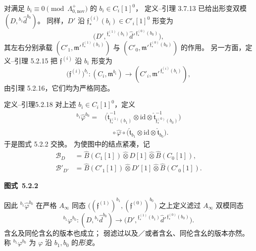 对满足
$b_i\equiv0\pmod{\Lambda_{0,\mathrm{nov}}^+}$
的 $b_i\in C_i[1]^0$，
定义--引理 3.7.13 已给出形变双模
$(D,{}^{b_1}\widehat d^{b_0})$。
同样，$D'$ 沿
$\mathfrak f^{(i)}_*(b_i)\in C'_i[1]^0$
形变为
\[
\bigl(D',{}^{\mathfrak f^{(1)}_*(b_1)}
\widehat d'^{\,\mathfrak f^{(0)}_*(b_0)}\bigr),
\]
其左右分别承载
$(C'_1,\mathfrak m'^{\,\mathfrak f^{(1)}_*(b_1)})$
与
$(C'_0,\mathfrak m'^{\,\mathfrak f^{(0)}_*(b_0)})$
的作用。
另一方面，定义--引理 5.2.15 把
$\mathfrak f^{(i)}$ 沿 $b_i$ 形变为
\[
\bigl(\mathfrak f^{(i)}\bigr)^{b_i}:
(C_i,\mathfrak m^{b_i})
\longrightarrow
(C'_i,\mathfrak m'^{\,\mathfrak f^{(i)}_*(b_i)}),
\]
由引理 5.2.16，它们均为严格同态。

\begin{statement}{定义--引理}{5.2.18}\label{deflem:5-2-18}
对上述 $b_i\in C_i[1]^0$，定义
\[
\begin{aligned}
{}^{b_1}\widehat\varphi^{b_0}
={}&\bigl(
\widehat{\mathfrak t}_{\mathfrak f^{(1)}_*(b_1)}^{-1}
\otimes\mathrm{id}\otimes
\widehat{\mathfrak t}_{\mathfrak f^{(0)}_*(b_0)}^{-1}
\bigr)\\
&\quad\circ\widehat\varphi\circ
\bigl(\widehat{\mathfrak t}_{b_1}
\otimes\mathrm{id}\otimes
\widehat{\mathfrak t}_{b_0}\bigr).
\end{aligned}
\]
于是图式 5.2.2 交换。
为使图中的结点紧凑，记
\[
\begin{aligned}
\mathcal B_D
&=\widehat B(C_1[1])\widehat\otimes D[1]
\widehat\otimes\widehat B(C_0[1]),\\
\mathcal B'_{D'}
&=\widehat B(C'_1[1])\widehat\otimes D'[1]
\widehat\otimes\widehat B(C'_0[1]).
\end{aligned}
\]
{\renewcommand{\thefigure}{5.2.2}
\begin{center}
{\normalfont\bfseries 图式~\thefigure}\label{diag:5-2-2}
\end{center}}
因此 ${}^{b_1}\widehat\varphi^{b_0}$
在严格 $A_\infty$ 同态
$\bigl((\mathfrak f^{(1)})^{b_1},
(\mathfrak f^{(0)})^{b_0}\bigr)$
之上定义滤过 $A_\infty$ 双模同态
\[
{}^{b_1}\varphi^{b_0}:
(D,{}^{b_1}\widehat d^{b_0})
\longrightarrow
\bigl(D',{}^{\mathfrak f^{(1)}_*(b_1)}
\widehat d'^{\,\mathfrak f^{(0)}_*(b_0)}\bigr).
\]
含幺及同伦含幺的版本也成立；
弱滤过以及／或者含幺、同伦含幺的版本亦然。
称 ${}^{b_1}\varphi^{b_0}$ 为
$\varphi$ 沿 $b_1,b_0$ 的\emph{形变}。
\end{statement}

